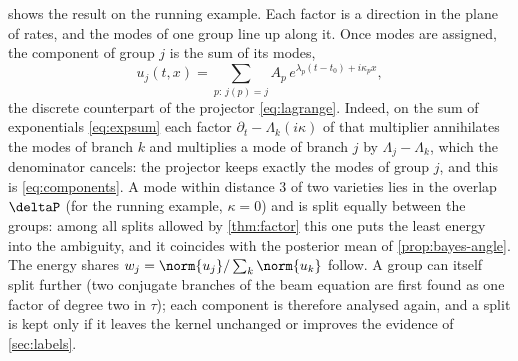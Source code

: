  shows the result on the running example. Each factor is a direction in the plane of rates, and the
modes of one group line up along it. Once modes are assigned, the component of group $j$ is the sum of its modes,
\begin{equation}\label{eq:components}
  u_j(t,x)=\sum_{p:\,j(p)=j}A_p\,e^{\lambda_p(t-t_0)+i\kappa_px},
\end{equation}
the discrete counterpart of the projector \eqref{eq:lagrange}. Indeed, on the sum of exponentials \eqref{eq:expsum} each factor $\partial_t-\Lambda_k(i\kappa)$ of that multiplier
annihilates the modes of branch $k$ and multiplies a mode of branch $j$ by $\Lambda_j-\Lambda_k$, which the denominator
cancels: the projector keeps exactly the modes of group $j$, and this is \eqref{eq:components}. A
mode within distance $3$ of two varieties lies in the overlap $\deltaP$ (for the running example, $\kappa=0$) and is split
equally between the groups: among all splits allowed by \cref{thm:factor} this one puts the least energy into the
ambiguity, and it coincides with the posterior mean of \cref{prop:bayes-angle}. The energy shares
$w_j=\norm{u_j}/\sum_k\norm{u_k}$ follow. A group can itself split further (two conjugate branches of the beam equation are
first found as one factor of degree two in $\tau$); each component is therefore analysed again, and a split is kept only
if it leaves the kernel unchanged or improves the evidence of \cref{sec:labels}.

